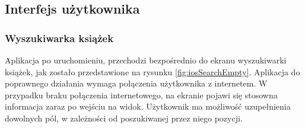 \documentclass[twoside]{projektInzynierskiMS}
\begin{document}
\subsection{Interfejs użytkownika}


\subsubsection{Wyszukiwarka książek}

Aplikacja po uruchomieniu, przechodzi bezpośrednio do ekranu wyszukiwarki książek, jak zostało przedstawione na rysunku \ref{fig:iosSearchEmpty}. Aplikacja do poprawnego działania wymaga połączenia użytkownika z internetem. W przypadku braku połączenia internetowego, na ekranie pojawi się stosowna informacja zaraz po wejściu na widok. Użytkownik ma możliwość uzupełnienia dowolnych pól, w zależności od poszukiwanej przez niego pozycji. 
\end{document}
